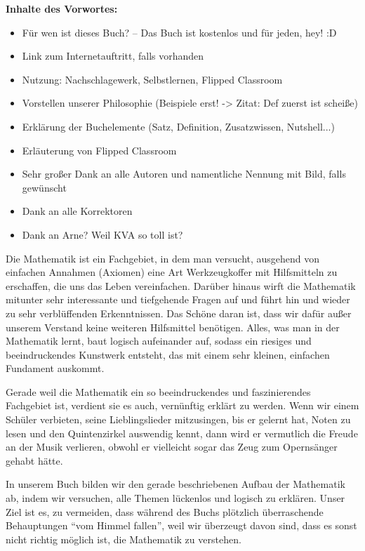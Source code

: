 \documentclass[../main.tex]{subfiles}
\begin{document}
\textbf{Inhalte des Vorwortes:}
\begin{itemize}
    \item Für wen ist dieses Buch? -- Das Buch ist kostenlos und für jeden, hey! :D
    \item Link zum Internetauftritt, falls vorhanden
    \item Nutzung: Nachschlagewerk, Selbstlernen, Flipped Classroom
    \item Vorstellen unserer Philosophie (Beispiele erst! -> Zitat: Def zuerst ist scheiße)
    \item Erklärung der Buchelemente (Satz, Definition, Zusatzwissen, Nutshell...)
    \item Erläuterung von Flipped Classroom
    \item Sehr großer Dank an alle Autoren und namentliche Nennung mit Bild, falls gewünscht
    \item Dank an alle Korrektoren
    \item Dank an Arne? Weil KVA so toll ist?
\end{itemize}
\fi

Die Mathematik ist ein Fachgebiet, in dem man versucht, ausgehend von einfachen Annahmen (Axiomen) eine Art Werkzeugkoffer mit Hilfsmitteln zu erschaffen, die uns das Leben vereinfachen. Darüber hinaus wirft die Mathematik mitunter sehr interessante und tiefgehende Fragen auf und führt hin und wieder zu sehr verblüffenden Erkenntnissen. Das Schöne daran ist, dass wir dafür außer unserem Verstand keine weiteren Hilfsmittel benötigen. Alles, was man in der Mathematik lernt, baut logisch aufeinander auf, sodass ein riesiges und beeindruckendes Kunstwerk entsteht, das mit einem sehr kleinen, einfachen Fundament auskommt.

Gerade weil die Mathematik ein so beeindruckendes und faszinierendes Fachgebiet ist, verdient sie es auch, vernünftig erklärt zu werden. Wenn wir einem Schüler verbieten, seine Lieblingslieder mitzusingen, bis er gelernt hat, Noten zu lesen und den Quintenzirkel auswendig kennt, dann wird er vermutlich die Freude an der Musik verlieren, obwohl er vielleicht sogar das Zeug zum Opernsänger gehabt hätte.

In unserem Buch bilden wir den gerade beschriebenen Aufbau der Mathematik ab, indem wir versuchen, alle Themen lückenlos und logisch zu erklären. Unser Ziel ist es, zu vermeiden, dass während des Buchs plötzlich überraschende Behauptungen \enquote{vom Himmel fallen}, weil wir überzeugt davon sind, dass es sonst nicht richtig möglich ist, die Mathematik zu verstehen.
\end{document}
